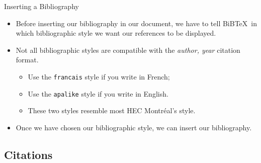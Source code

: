 \begin{frame}[fragile]{Inserting a Bibliography}
	\begin{itemize}
		\item Before inserting our bibliography in our document, we have to tell BiB\TeX\ in which bibliographic style we want our references to be displayed.
\begin{codesource}
	
\end{codesource}
		
		\pause
		
		\item Not all bibliographic styles are compatible with the \emph{author, year} citation format. 
			\begin{itemize}
				\scriptsize
				\item Use the \texttt{francais} style if you write in French;
				\item Use the \texttt{apalike} style if you write in English.
\begin{codesource}
	
	
	
\end{codesource}
				\item These two styles resemble most HEC Montréal's style.
			\end{itemize}
		
		\pause
		
		\item Once we have chosen our bibliographic style, we can insert our bibliography.
\begin{codesource}
	
\end{codesource}
	\end{itemize}
\end{frame}

\subsection{Citations}

